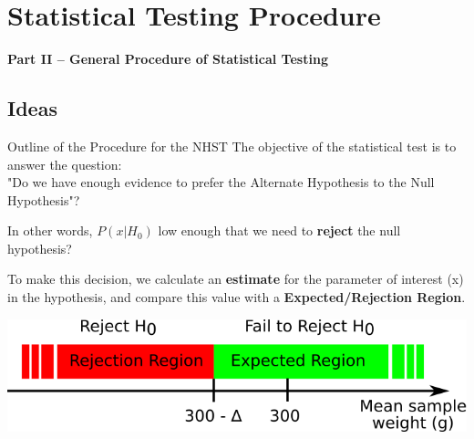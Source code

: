 \section{Statistical Testing Procedure}

\begin{frame}
  \begin{center}
    {\bf Part II -- General Procedure of Statistical Testing}
  \end{center}
\end{frame}

\subsection{Ideas}
\begin{frame}{Outline of the Procedure for the NHST}
  The objective of the statistical test is to answer the question:\\
  "Do we have enough evidence to prefer the Alternate Hypothesis to the Null Hypothesis"?\bigskip

  In other words, $P(x|H_0)$ low enough that we need to {\bf reject} the null hypothesis?\bigskip

  To make this decision, we calculate an {\bf estimate} for the parameter of interest (x) in the hypothesis, and compare this value with a {\bf Expected/Rejection Region}.
  \begin{center}
    \includegraphics[width=.8\textwidth]{../img/critical_region}
  \end{center}
\end{frame}

